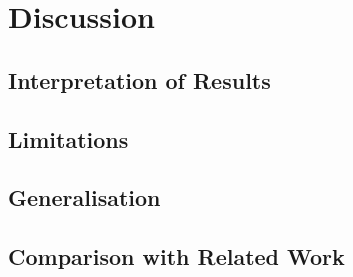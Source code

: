 \chapter{Discussion}\label{ch:discussion}

\section{Interpretation of Results}\label{sec:interpretation}

\section{Limitations}\label{sec:limitations}

\section{Generalisation}\label{sec:generalisation-disc}

\section{Comparison with Related Work}\label{sec:comparison}
